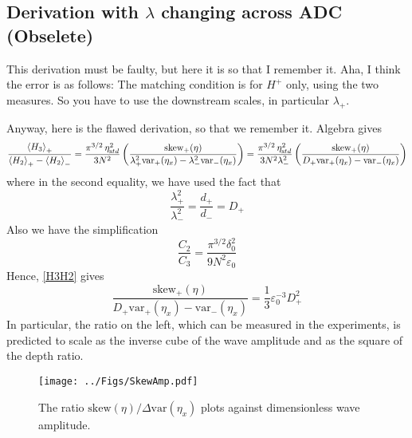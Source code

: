 \documentclass[11pt]{article}
\newcommand{\vsp}[1]{\vspace{#1 pc} \noindent}
\newcommand{\mean}[1]{\left< #1 \right>}
\newcommand{\eps}{\varepsilon}
\newcommand{\etastd}{\eta_{\text std}}
\newcommand{\depth}{d}
\newcommand{\dup}{\depth_{-}}
\newcommand{\ddn}{\depth_{+}}
\newcommand{\lam}{\lambda}
\newcommand{\lamup}{\lam_{-}}
\newcommand{\lamdn}{\lam_{+}}
\newcommand{\lamfac}{N}
\newcommand{\drat}{D}
\newcommand{\dratdn}{\drat_+}
\newcommand{\skw}{\text{skew}}
\newcommand{\skwdn}{\skw_+}
\newcommand{\var}{\text{var}}
\newcommand{\varup}{\var_-}
\newcommand{\vardn}{\var_+}
\newcommand{\epsup}{\eps_0}
\newcommand{\delup}{\delta_0}
\newcommand{\Ham}{H}
\newcommand{\Hdn}{\Ham^{+}}
\newcommand{\meanup}[1]{\mean{#1}_{-}}
\newcommand{\meandn}[1]{\mean{#1}_{+}}
\begin{document}
\subsection{Derivation with $\lam$ changing across ADC (Obselete)}
This derivation must be faulty, but here it is so that I remember it.
Aha, I think the error is as follows: The matching condition is for $\Hdn$ only, using the two measures. So you have to use the downstream scales, in particular $\lamdn$. 

\vsp{1}
Anyway, here is the flawed derivation, so that we remember it.
Algebra gives
\begin{equation}
\frac{\meandn{H_3}} {\meandn{H_2} - \meanup{H_2}} = 
\frac{\pi^{3/2} \, \etastd^2} {3 \lamfac^2} 
\left( \frac{\skwdn(\eta)}{ \lamdn^2 \vardn(\eta_x) - \lamup^2 \varup(\eta_x)} \right) = 
\frac{\pi^{3/2} \, \etastd^2} {3 \lamfac^2 \lamup^2} 
\left( \frac{\skwdn(\eta)} {\dratdn \vardn(\eta_x) - \varup(\eta_x)} \right)
\end{equation}
where in the second equality, we have used the fact that
\begin{equation}
\frac{\lamdn^2}{\lamup^2} = \frac{\ddn}{\dup} = \dratdn
\end{equation}
Also we have the simplification
\begin{equation}
\frac{C_2}{C_3} = \frac{\pi^{3/2} \delup^2}{9 \lamfac^2 \epsup}
\end{equation}
Hence, \eqref{H3H2} gives
\begin{equation}
\frac{\skwdn(\eta)} {\dratdn \vardn(\eta_x) - \varup(\eta_x)} = \frac{1}{3} \epsup^{-3} \dratdn^2
\end{equation}
In particular, the ratio on the left, which can be measured in the experiments, is predicted to scale as the inverse cube of the wave amplitude and as the square of the depth ratio.

\begin{figure}%
\begin{center}
\texttt{[image: ../Figs/SkewAmp.pdf]}
\caption{\label{fig1} 
The ratio ${\skw(\eta)}/{\Delta \var(\eta_x)}$ plots against dimensionless wave amplitude.
}
\end{center}
\end{figure}



\end{document}

